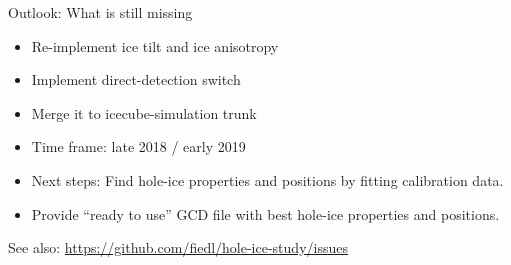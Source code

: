 
\begin{frame}{Outlook: What is still missing}
  \begin{itemize}
    \item Re-implement ice tilt and ice anisotropy
    \item Implement direct-detection switch
    \item Merge it to icecube-simulation trunk
    \item Time frame: late 2018 / early 2019
  \end{itemize}

  \bigskip
  \begin{itemize}
    \item Next steps: Find hole-ice properties and positions by fitting calibration data.
    \item Provide ``ready to use'' GCD file with best hole-ice properties and positions.
  \end{itemize}

  \bigskip

  See also: \url{https://github.com/fiedl/hole-ice-study/issues}
\end{frame}
